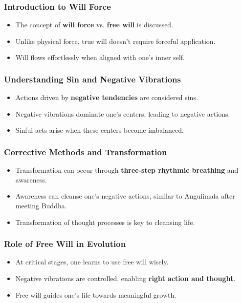 \begin{frame}[fragile]\frametitle{Introduction to Will Force}
    \begin{itemize}
        \item The concept of \textbf{will force} vs. \textbf{free will} is discussed.
        \item Unlike physical force, true will doesn't require forceful application.
        \item Will flows effortlessly when aligned with one's inner self.
    \end{itemize}
\end{frame}

\begin{frame}[fragile]\frametitle{Understanding Sin and Negative Vibrations}
    \begin{itemize}
        \item Actions driven by \textbf{negative tendencies} are considered sins.
        \item Negative vibrations dominate one's centers, leading to negative actions.
        \item Sinful acts arise when these centers become imbalanced.
    \end{itemize}
\end{frame}

\begin{frame}[fragile]\frametitle{Corrective Methods and Transformation}
    \begin{itemize}
        \item Transformation can occur through \textbf{three-step rhythmic breathing} and awareness.
        \item Awareness can cleanse one's negative actions, similar to Angulimala after meeting Buddha.
        \item Transformation of thought processes is key to cleansing life.
    \end{itemize}
\end{frame}

\begin{frame}[fragile]\frametitle{Role of Free Will in Evolution}
    \begin{itemize}
        \item At critical stages, one learns to use free will wisely.
        \item Negative vibrations are controlled, enabling \textbf{right action and thought}.
        \item Free will guides one's life towards meaningful growth.
    \end{itemize}
\end{frame}

